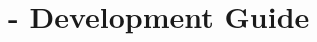 \chapter{\texorpdfstring{\protect\marktool{\toolnameshort}}{\toolnameshort} - Development Guide}
\setcounter{currentlevel}{6}



\newpage


\newpage



\newpage

